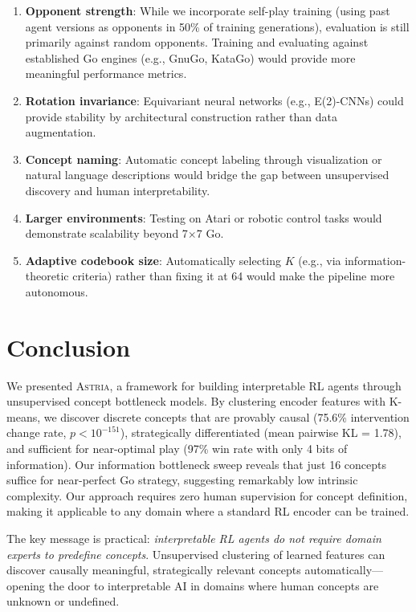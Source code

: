 \documentclass[11pt,a4paper]{article}
\newcommand{\astria}{\textsc{Astria}}
\begin{document}
\begin{enumerate}[leftmargin=*]
    \item \textbf{Opponent strength}: While we incorporate self-play training (using past agent versions as opponents in 50\% of training generations), evaluation is still primarily against random opponents. Training and evaluating against established Go engines (e.g., GnuGo, KataGo) would provide more meaningful performance metrics.
    \item \textbf{Rotation invariance}: Equivariant neural networks (e.g., E(2)-CNNs) could provide stability by architectural construction rather than data augmentation.
    \item \textbf{Concept naming}: Automatic concept labeling through visualization or natural language descriptions would bridge the gap between unsupervised discovery and human interpretability.
    \item \textbf{Larger environments}: Testing on Atari or robotic control tasks would demonstrate scalability beyond 7$\times$7 Go.
    \item \textbf{Adaptive codebook size}: Automatically selecting $K$ (e.g., via information-theoretic criteria) rather than fixing it at 64 would make the pipeline more autonomous.
\end{enumerate}

\section{Conclusion}

We presented \astria{}, a framework for building interpretable RL agents through unsupervised concept bottleneck models. By clustering encoder features with K-means, we discover discrete concepts that are provably causal (75.6\% intervention change rate, $p < 10^{-151}$), strategically differentiated (mean pairwise KL = 1.78), and sufficient for near-optimal play (97\% win rate with only 4 bits of information). Our information bottleneck sweep reveals that just 16 concepts suffice for near-perfect Go strategy, suggesting remarkably low intrinsic complexity. Our approach requires zero human supervision for concept definition, making it applicable to any domain where a standard RL encoder can be trained.

The key message is practical: \emph{interpretable RL agents do not require domain experts to predefine concepts}. Unsupervised clustering of learned features can discover causally meaningful, strategically relevant concepts automatically---opening the door to interpretable AI in domains where human concepts are unknown or undefined.
\end{document}
